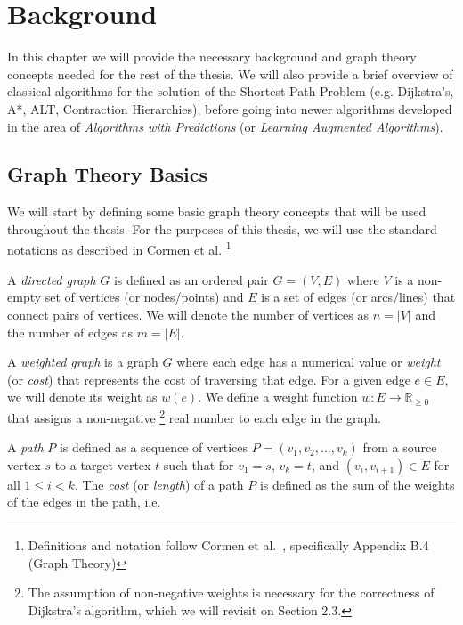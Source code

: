 \chapter{Background}
\label{ch:background}

In this chapter we will provide the necessary background and graph theory concepts needed for the rest of the thesis.
We will also provide a brief overview of classical algorithms for the solution of the Shortest Path Problem
(e.g. Dijkstra's\cite{dijkstraNoteTwoProblems1959}, A*\cite{hartFormalBasisHeuristic1968b}, ALT\cite{goldbergComputingShortestPath2005}, Contraction Hierarchies\cite{geisbergerContractionHierarchiesFaster2008}),
before going into newer algorithms developed in the area of \textit{Algorithms with Predictions} (or \textit{Learning Augmented Algorithms}).

\section{Graph Theory Basics}
We will start by defining some basic graph theory concepts that will be used throughout the thesis.
For the purposes of this thesis, we will use the standard notations as described in Cormen et al.\cite{cormenIntroductionAlgorithms2009}
\footnote{Definitions and notation follow Cormen et al.~\cite{cormenIntroductionAlgorithms2009}, specifically Appendix B.4 (Graph Theory)}

A \textit{directed graph} $G$ is defined as an ordered pair $G=(V, E)$ where $V$ is a non-empty set of vertices (or nodes/points) and $E$ is a set of edges (or arcs/lines) that connect pairs of vertices.
We will denote the number of vertices as $n = |V|$ and the number of edges as $m = |E|$.

A \textit{weighted graph} is a graph $G$ where each edge has a numerical value or \textit{weight} (or \textit{cost}) that represents the cost of traversing that edge.
For a given edge $e \in E$, we will denote its weight as $w(e)$.
We define a weight function $w: E \rightarrow \mathbb{R}_{\geq 0}$
that assigns a non-negative
\footnote{The assumption of non-negative weights is necessary for the correctness of Dijkstra's algorithm, which we will revisit on Section 2.3.}
real number to each edge in the graph.

A \textit{path} $P$ is defined as a sequence of vertices $P = (v_1, v_2, ..., v_k)$ from a source vertex $s$ to a target vertex $t$ 
such that for $v_1 = s$, $v_k = t$, and $(v_i, v_{i+1}) \in E$ for all $1 \leq i < k$.
The \textit{cost} (or \textit{length}) of a path $P$ is defined as the sum of the weights of the edges in the path, i.e.

